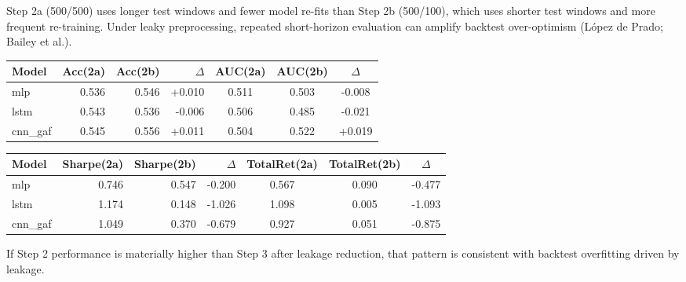 Step 2a (500/500) uses longer test windows and fewer model re-fits than Step 2b (500/100), which uses shorter test windows and more frequent re-training. Under leaky preprocessing, repeated short-horizon evaluation can amplify backtest over-optimism (L\'opez de Prado; Bailey et al.).

\begin{table}[H]
\centering
\small
\begin{tabular}{lrrrccc}
\toprule
Model & Acc(2a) & Acc(2b) & $\Delta$ & AUC(2a) & AUC(2b) & $\Delta$\\
\midrule
mlp & 0.536 & 0.546 & +0.010 & 0.511 & 0.503 & -0.008 \\
lstm & 0.543 & 0.536 & -0.006 & 0.506 & 0.485 & -0.021 \\
cnn\_gaf & 0.545 & 0.556 & +0.011 & 0.504 & 0.522 & +0.019 \\
\bottomrule
\end{tabular}
\end{table}

\begin{table}[H]
\centering
\small
\begin{tabular}{lrrrccc}
\toprule
Model & Sharpe(2a) & Sharpe(2b) & $\Delta$ & TotalRet(2a) & TotalRet(2b) & $\Delta$\\
\midrule
mlp & 0.746 & 0.547 & -0.200 & 0.567 & 0.090 & -0.477 \\
lstm & 1.174 & 0.148 & -1.026 & 1.098 & 0.005 & -1.093 \\
cnn\_gaf & 1.049 & 0.370 & -0.679 & 0.927 & 0.051 & -0.875 \\
\bottomrule
\end{tabular}
\end{table}

If Step 2 performance is materially higher than Step 3 after leakage reduction, that pattern is consistent with backtest overfitting driven by leakage.

